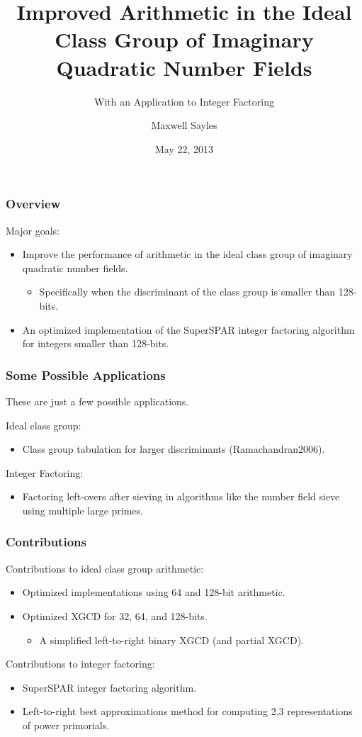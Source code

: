 \documentclass{beamer}
\title[]{Improved Arithmetic in the Ideal Class Group of Imaginary Quadratic Number Fields}
\subtitle{With an Application to Integer Factoring}
\author{Maxwell Sayles}
\date{May 22, 2013}
\institute{
	\bigskip 
       Department of Computer Science \\
       University of Calgary
}
\begin{document}
\maketitle

\begin{frame}
\frametitle{Overview}

Major goals:
\begin{itemize}
\item Improve the performance of arithmetic in the ideal class group of imaginary quadratic number fields.
	\begin{itemize}
	\item Specifically when the discriminant of the class group is smaller than 128-bits.
	\end{itemize}
\item An optimized implementation of the SuperSPAR integer factoring algorithm for integers smaller than 128-bits.
\end{itemize}

\end{frame}

\begin{frame}
\frametitle{Some Possible Applications}
These are just a few possible applications. \bigskip

Ideal class group:
\begin{itemize}
\item Class group tabulation for larger discriminants \break (Ramachandran2006).
\end{itemize}

\bigskip
Integer Factoring:
\begin{itemize}
\item Factoring left-overs after sieving in algorithms like the number field sieve using multiple large primes.
\end{itemize}

\end{frame}

\begin{frame}
\frametitle{Contributions}
Contributions to ideal class group arithmetic:
\begin{itemize} %
\item Optimized implementations using 64 and 128-bit arithmetic.
\item Optimized XGCD for 32, 64, and 128-bits.
	\begin{itemize}
	\item A simplified left-to-right binary XGCD (and partial XGCD).
	\end{itemize}
\end{itemize}

\bigskip
Contributions to integer factoring:
\begin{itemize}
\item SuperSPAR integer factoring algorithm.
\item Left-to-right best approximations method for computing 2,3 representations of power primorials.
\end{itemize}
\end{frame}
\end{document}
